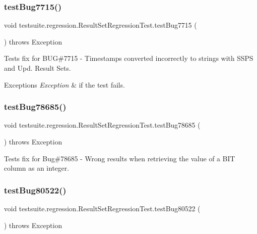 \subsubsection{\texorpdfstring{test\+Bug7715()}{testBug7715()}}
{\footnotesize\ttfamily void testsuite.\+regression.\+Result\+Set\+Regression\+Test.\+test\+Bug7715 (\begin{DoxyParamCaption}{ }\end{DoxyParamCaption}) throws Exception}

Tests fix for B\+UG\#7715 -\/ Timestamps converted incorrectly to strings with S\+S\+PS and Upd. Result Sets.


\begin{DoxyExceptions}{Exceptions}
{\em Exception} & if the test fails. \\
\hline
\end{DoxyExceptions}
\mbox{\label{classtestsuite_1_1regression_1_1_result_set_regression_test_a438ea870d217dc3c5a0df443b040c99f}} 
\subsubsection{\texorpdfstring{test\+Bug78685()}{testBug78685()}}
{\footnotesize\ttfamily void testsuite.\+regression.\+Result\+Set\+Regression\+Test.\+test\+Bug78685 (\begin{DoxyParamCaption}{ }\end{DoxyParamCaption}) throws Exception}

Tests fix for Bug\#78685 -\/ Wrong results when retrieving the value of a B\+IT column as an integer. \mbox{\label{classtestsuite_1_1regression_1_1_result_set_regression_test_ad8d477bdbce9cdf7a7934f944d398fb3}} 
\subsubsection{\texorpdfstring{test\+Bug80522()}{testBug80522()}}
{\footnotesize\ttfamily void testsuite.\+regression.\+Result\+Set\+Regression\+Test.\+test\+Bug80522 (\begin{DoxyParamCaption}{ }\end{DoxyParamCaption}) throws Exception}


